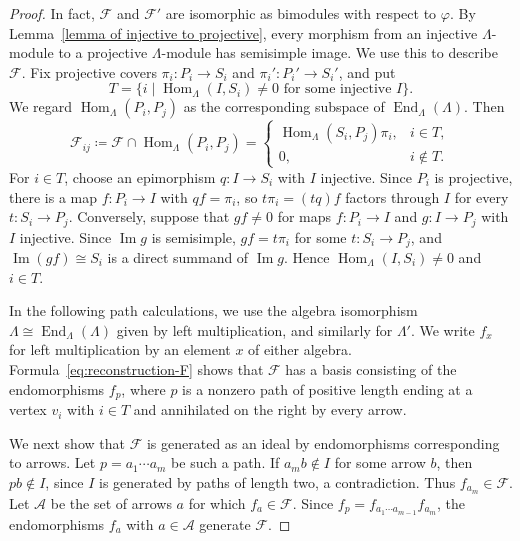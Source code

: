 \documentclass[11pt]{article}
\newcommand{\Hom}{\operatorname{Hom}}
\newcommand{\End}{\operatorname{End}}
\renewcommand{\Im}{\operatorname{Im}}
\renewcommand{\cal}[1]{\mathcal #1}   %
\providecommand{\varLambda}{\Lambda}
\theoremstyle{definition}
\begin{document}
\begin{proof}
			In fact, $\cal{F}$ and $\cal{F}'$ are isomorphic as bimodules with respect to $\varphi$.
			By Lemma~\ref{lemma of injective to projective}, every morphism from an injective $\varLambda$-module to a projective $\varLambda$-module has semisimple image.
			We use this to describe $\cal{F}$.
			Fix projective covers $\pi_i\colon P_i\to S_i$ and $\pi_i'\colon P_i'\to S_i'$, and put
			\[
				T=\{i\mid\Hom_{\varLambda}(I,S_i)\ne0\text{ for some injective }I\}.
			\]
			We regard $\Hom_{\varLambda}(P_i,P_j)$ as the corresponding subspace of $\End_{\varLambda}(\varLambda)$.
			Then
			\begin{equation}\label{eq:reconstruction-F}
				\cal{F}_{ij}\coloneq\cal{F}\cap\Hom_{\varLambda}(P_i,P_j)=
				\begin{cases}
					\Hom_{\varLambda}(S_i,P_j)\pi_i,&i\in T,\\
					0,&i\notin T.
				\end{cases}
			\end{equation}
			For $i\in T$, choose an epimorphism $q:I\to S_i$ with $I$ injective.
			Since $P_i$ is projective, there is a map $f:P_i\to I$ with $qf=\pi_i$, so $t\pi_i=(tq)f$ factors through $I$ for every $t:S_i\to P_j$.
			Conversely, suppose that $gf\ne0$ for maps $f:P_i\to I$ and $g:I\to P_j$ with $I$ injective.
			Since $\Im g$ is semisimple, $gf=t\pi_i$ for some $t:S_i\to P_j$, and $\Im(gf)\cong S_i$ is a direct summand of $\Im g$.
			Hence $\Hom_{\varLambda}(I,S_i)\ne0$ and $i\in T$.

			In the following path calculations, we use the algebra isomorphism $\varLambda\cong\End_{\varLambda}(\varLambda)$ given by left multiplication, and similarly for $\varLambda'$.
			We write $f_x$ for left multiplication by an element $x$ of either algebra.
			Formula~\eqref{eq:reconstruction-F} shows that $\cal{F}$ has a basis consisting of the endomorphisms $f_p$, where $p$ is a nonzero path of positive length ending at a vertex $v_i$ with $i\in T$ and annihilated on the right by every arrow.

			We next show that $\cal{F}$ is generated as an ideal by endomorphisms corresponding to arrows.
			Let $p=a_1\cdots a_m$ be such a path.
			If $a_mb\notin I$ for some arrow $b$, then $pb\notin I$, since $I$ is generated by paths of length two, a contradiction.
			Thus $f_{a_m}\in\cal{F}$.
			Let $\cal{A}$ be the set of arrows $a$ for which $f_a\in\cal{F}$.
			Since $f_p=f_{a_1\cdots a_{m-1}}f_{a_m}$, the endomorphisms $f_a$ with $a\in\cal{A}$ generate $\cal{F}$.
		


\end{proof}
\end{document}
